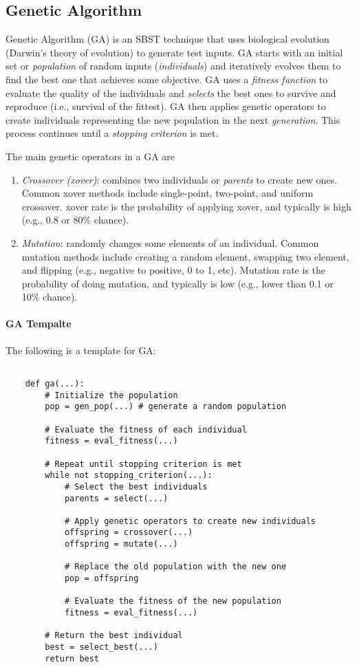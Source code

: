 \documentclass[oneside,11pt,dvipsnames]{book}
\begin{document}
\subsection{Genetic Algorithm}\label{sec:ga}

Genetic Algorithm (GA) is an SBST technique that uses biological evolution (Darwin's theory of evolution) to generate test inputs.
GA starts with an initial set or \emph{population} of random inputs (\emph{individuals}) and iteratively evolves them to find the best one that achieves some objective. GA uses a \emph{fitness function} to evaluate the quality of the individuals and \emph{selects} the best ones to survive and reproduce (i.e., survival of the fittest). GA then applies genetic operators to create individuals representing the new population in the next \emph{generation}. This process continues until a \emph{stopping criterion} is met.

The main genetic operators in a GA are
\begin{enumerate}
    \item \emph{Crossover (xover)}: combines two individuals or \emph{parents} to create new ones. Common xover methods include single-point, two-point, and uniform crossover. xover rate is the probability of applying xover, and typically is high (e.g., 0.8 or 80\% chance).
    \item \emph{Mutation}: randomly changes some elements of an individual. Common mutation methods include creating a random element, swapping two element, and flipping (e.g., negative to positive, 0 to 1, etc). Mutation rate is the probability of doing mutation, and typically is low (e.g., lower than 0.1 or 10\% chance).
\end{enumerate}

\paragraph{GA Tempalte} The following is a template for GA:
\begin{lstlisting}

    def ga(...):
        # Initialize the population
        pop = gen_pop(...) # generate a random population

        # Evaluate the fitness of each individual
        fitness = eval_fitness(...)

        # Repeat until stopping criterion is met
        while not stopping_criterion(...):
            # Select the best individuals
            parents = select(...)
            
            # Apply genetic operators to create new individuals
            offspring = crossover(...)
            offspring = mutate(...)
            
            # Replace the old population with the new one
            pop = offspring

            # Evaluate the fitness of the new population
            fitness = eval_fitness(...)
            
        # Return the best individual
        best = select_best(...)
        return best
\end{lstlisting}
\end{document}
